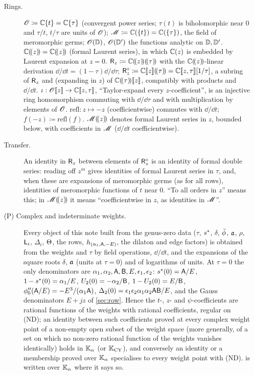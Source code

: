 \begin{lem}
\label{lem:set-rings}
\begin{description}
\item[Rings.] $\mathscr{O}\coloneqq\mathbb{C}\{t\}=\mathbb{C}\{\tau\}$ (convergent power series; $\tau(t)$ is biholomorphic near $0$ and $\tau/t$, $t/\tau$ are units of $\mathscr{O}$); $\mathscr{M}\coloneqq\mathbb{C}(\{t\})=\mathbb{C}(\{\tau\})$, the field of meromorphic germs; $\mathscr{O}(\mathbb{D})$, $\mathscr{O}(\mathbb{D}')$ the functions analytic on $\mathbb{D},\mathbb{D}'$. $\mathbb{C}(\!(z)\!)=\mathbb{C}(\!(z)\!)$ (formal Laurent series), in which $\mathbb{C}(z)$ is embedded by Laurent expansion at $z=0$. $\mathsf{R}_{z}\coloneqq\mathbb{C}(\!(z)\!)(\!(\tau)\!)$ with the $\mathbb{C}(\!(z)\!)$-linear derivation $\dd/\dd t=(1-\tau)\dd/\dd\tau$; $\mathsf{R}_{z}^{\circ}\coloneqq\mathbb{C}[\![ z ]\!](\!(\tau)\!)=\mathbb{C}[\![ z,\tau ]\!][1/\tau]$, a subring of $\mathsf{R}_{z}$ and (expanding in $z$) of $\mathbb{C}(\!(\tau)\!)[\![ z ]\!]$, compatibly with products and $\dd/\dd t$. $\iota:\mathscr{O}[\![ z ]\!]\to\mathbb{C}[\![ z,\tau ]\!]$, ``Taylor-expand every $z$-coefficient'', is an injective ring homomorphism commuting with $\dd/\dd\tau$ and with multiplication by elements of $\mathscr{O}$. $\mathrm{refl}:z\mapsto-z$ (coefficientwise) commutes with $\dd/\dd t$; $f(-z)\coloneqq\mathrm{refl}(f)$. $\mathscr{M}(\!(z)\!)$ denotes formal Laurent series in $z$, bounded below, with coefficients in $\mathscr{M}$ ($\dd/\dd t$ coefficientwise).
\item[Transfer.] An identity in $\mathsf{R}_{z}$ between elements of $\mathsf{R}_{z}^{\circ}$ is an identity of formal double series: reading off $z^m$ gives identities of formal Laurent series in $\tau$, and, when these are expansions of meromorphic germs (as for all rows), identities of meromorphic functions of $t$ near $0$. ``To all orders in $z$'' means this; in $\mathscr{M}(\!(z)\!)$ it means ``coefficientwise in $z$, as identities in $\mathscr{M}$''.
\item[(P) Complex and indeterminate weights.] Every object of this note built from the genus-zero data ($\tau$, $s^{\ast}$, $\delta$, $\breve{\phi}$, $\mathfrak{a}$, $\rho$, $\mathsf{L}_i$, $\Delta_i$, $\Theta$, the rows, $h_{(\alpha_1,\mathsf{A},-E)}$, the dilaton and edge factors) is obtained from the weights and $\tau$ by field operations, $\dd/\dd t$, and the expansions of the square roots $\delta$, $\mathfrak{a}$ (units at $\tau=0$) and of logarithms of units. At $\tau=0$ the only denominators are $\alpha_1,\alpha_2,\mathsf{A},\mathsf{B},E,\epsilon_1,\epsilon_2$: $s^{\ast}(0)=\mathsf{A}/E$, $1-s^{\ast}(0)=\alpha_1/E$, $U_2(0)=-\alpha_2/\mathsf{B}$, $1-U_2(0)=E/\mathsf{B}$, $\phi_0''(\mathsf{A}/E)=-E^3/(\alpha_1\mathsf{A})$, $\Delta_2(0)=\epsilon_1\epsilon_2\alpha_1\alpha_2\mathsf{A}\mathsf{B}/E$, and the Gauss denominators $E+jz$ of \cref{sec:row}. Hence the $t$-, $z$- and $\psi$-coefficients are rational functions of the weights with rational coefficients, regular on (ND); an identity between such coefficients proved at every complex weight point of a non-empty open subset of the weight space (more generally, of a set on which no non-zero rational function of the weights vanishes identically) holds in $\mathbb{K}_{\alpha}$ (or $\mathbb{K}_{\mathrm{CY}}$), and conversely an identity or a membership proved over $\mathbb{K}_{\alpha}$ specialises to every weight point with (ND).  is written over $\mathbb{K}_{\alpha}$ where it says so.

\end{description}
\end{lem}
